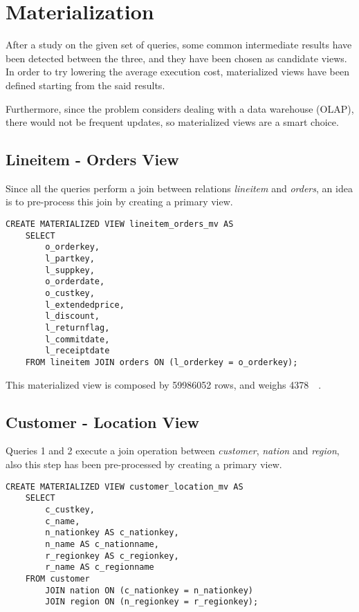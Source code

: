 

\section{Materialization}
\label{section:materialization}

After a study on the given set of queries, some common intermediate results have been detected between the three, and they have been chosen as candidate views. In order to try lowering the average execution cost, materialized views have been defined starting from the said results.

Furthermore, since the problem considers dealing with a data warehouse (OLAP), there would not be frequent updates, so materialized views are a smart choice.

\subsection{Lineitem - Orders View}
Since all the queries perform a join between relations \textit{lineitem} and \textit{orders}, an idea is to pre-process this join by creating a primary view.

\begin{lstlisting}
CREATE MATERIALIZED VIEW lineitem_orders_mv AS
	SELECT 
		o_orderkey, 
		l_partkey, 
		l_suppkey, 
		o_orderdate, 
		o_custkey, 
		l_extendedprice, 
		l_discount, 
		l_returnflag,
		l_commitdate,
		l_receiptdate
	FROM lineitem JOIN orders ON (l_orderkey = o_orderkey);
\end{lstlisting}

This materialized view is composed by \num{59986052} rows, and weighs \SI{4378}{\mega\byte}.

\subsection{Customer - Location View}
Queries 1 and 2 execute a join operation between \textit{customer}, \textit{nation} and \textit{region}, also this step has been pre-processed by creating a primary view.

\begin{lstlisting}
CREATE MATERIALIZED VIEW customer_location_mv AS
	SELECT 
		c_custkey, 
		c_name, 
		n_nationkey AS c_nationkey, 
		n_name AS c_nationname, 
		r_regionkey AS c_regionkey, 
		r_name AS c_regionname 
	FROM customer 
		JOIN nation ON (c_nationkey = n_nationkey)
		JOIN region ON (n_regionkey = r_regionkey);
\end{lstlisting}

